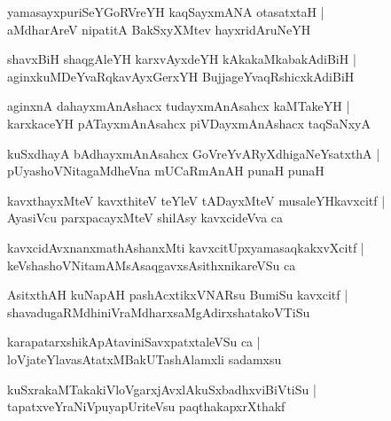 \documentclass[twoside,12pt,openright]{book}
\newcounter{shloka}[chapter]
\begin{document}
\begin{shloka}%
yamasayxpuriSeYGoRVreYH kaqSayxmANA otasatxtaH |\\
aMdharAreV nipatitA BakSxyXMtev hayxridAruNeYH 
\end{shloka}

\begin{shloka}%
shavxBiH shaqgAleYH karxvAyxdeYH kAkakaMkabakAdiBiH |\\
aginxkuMDeYvaRqkavAyxGerxYH BujjageYvaqRshicxkAdiBiH
\end{shloka}

\begin{shloka}%
aginxnA dahayxmAnAshacx tudayxmAnAsahcx kaMTakeYH |\\
karxkaceYH pATayxmAnAsahcx piVDayxmAnAshacx taqSaNxyA 
\end{shloka}

\begin{shloka}%
kuSxdhayA bAdhayxmAnAsahcx GoVreYvARyXdhigaNeYsatxthA |\\
pUyashoVNitagaMdheVna mUCaRmAnAH punaH punaH 
\end{shloka}

\begin{shloka}%
kavxthayxMteV kavxthiteV teYleV tADayxMteV musaleYHkavxcitf |\\
AyasiVcu parxpacayxMteV shilAsy kavxcideVva ca 
\end{shloka}

\begin{shloka}%
kavxcidAvxnanxmathAshanxMti kavxcitUpxyamasaqkakxvXcitf |\\
keVshashoVNitamAMsAsaqgavxsAsithxnikareVSu ca 
\end{shloka}

\begin{shloka}%
AsitxthAH kuNapAH pashAcxtikxVNARsu BumiSu kavxcitf |\\
shavadugaRMdhiniVraMdharxsaMgAdirxshatakoVTiSu
\end{shloka}

\begin{shloka}%
karapatarxshikApAtaviniSavxpatxtaleVSu ca |\\
loVjateYlavasAtatxMBakUTashAlamxli sadamxsu
\end{shloka}

\begin{shloka}%
kuSxrakaMTakakiVloVgarxjAvxlAkuSxbadhxviBiVtiSu |\\
tapatxveYraNiVpuyapUriteVsu paqthakapxrXthakf
\end{shloka}
\end{document}

